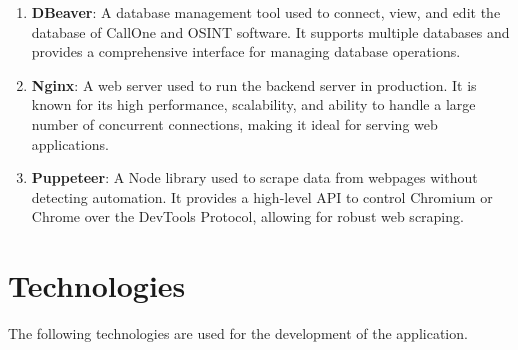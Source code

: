 \begin{enumerate}[label=\roman*.]
  \item \textbf{DBeaver}: A database management tool used to connect, view, and edit the database of CallOne and OSINT software.
  It supports multiple databases and provides a comprehensive interface for managing database operations.\cite{DBeaver}
  \item \textbf{Nginx}: A web server used to run the backend server in production.
  It is known for its high performance, scalability, and ability to handle a large number of concurrent connections, making it ideal for serving web applications. \cite{Nginx}
  \item \textbf{Puppeteer}: A Node library used to scrape data from webpages without detecting automation.
  It provides a high-level API to control Chromium or Chrome over the DevTools Protocol, allowing for robust web scraping.\cite{Puppeteer}
\end{enumerate}

\section{Technologies}\label{sec:technologies}
\justify

The following technologies are used for the development of the application.

